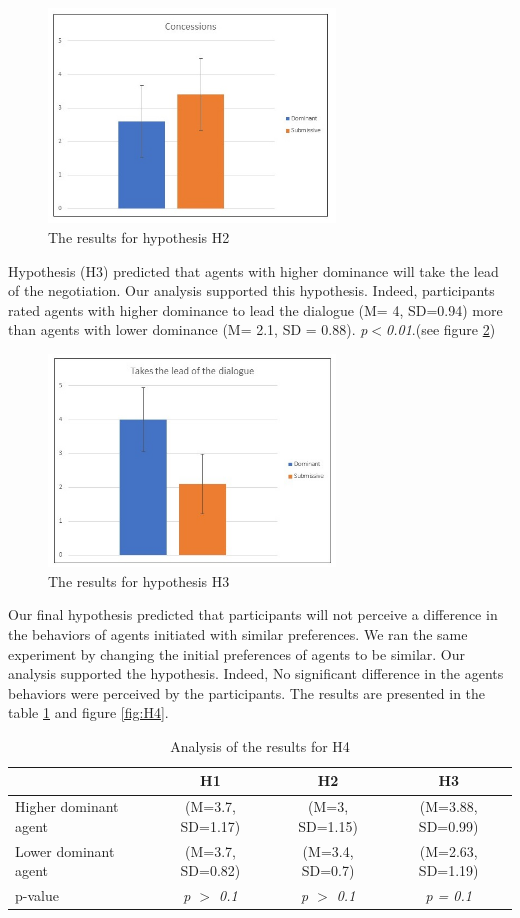 \documentclass{llncs}
\begin{document}
			\begin{figure}[h]
				\centering
				\caption{\label{concession} The results for hypothesis H2}
				\includegraphics[width=3in]{plots/conced}
			\end{figure}
		
		\par Hypothesis (H3) predicted that agents with higher dominance will take the lead of the negotiation. Our analysis supported this hypothesis. Indeed, participants rated agents with higher dominance to lead the dialogue (M= 4, SD=0.94) more than agents with lower dominance (M= 2.1, SD = 0.88). \emph{p$<$0.01}.(see figure  \ref{lead})
				\begin{figure}[h]
					\centering
					\caption{\label{lead} The results for hypothesis H3}
					\includegraphics[width=3in]{plots/lead}
				\end{figure}
		\par Our final hypothesis predicted that participants will not perceive a difference in the behaviors of agents initiated with similar preferences. We ran the same experiment by changing the initial preferences of agents to be similar.  Our analysis supported the hypothesis. Indeed, No significant difference in the agents behaviors were perceived by the participants. The results are presented in the table \ref{resume} and figure \ref{fig:H4}.
	\begin{table}
		
	\begin{tabular}{|l|c|c|c|}
	
		\hline
		   & H1 & H2 & H3 \\
		\hline
		Higher dominant agent & (M=3.7, SD=1.17) & (M=3, SD=1.15) &(M=3.88, SD=0.99) \\
		\hline
		Lower dominant agent & (M=3.7, SD=0.82) & (M=3.4, SD=0.7) & (M=2.63, SD=1.19)\\
		\hline
		p-value &  \emph{p $>$ 0.1}  & \emph{p $>$ 0.1}  & \emph{p = 0.1} \\
		\hline
	\end{tabular}
		\caption{\label{resume} Analysis of the results for H4}
	\end{table}
	
\end{document}
